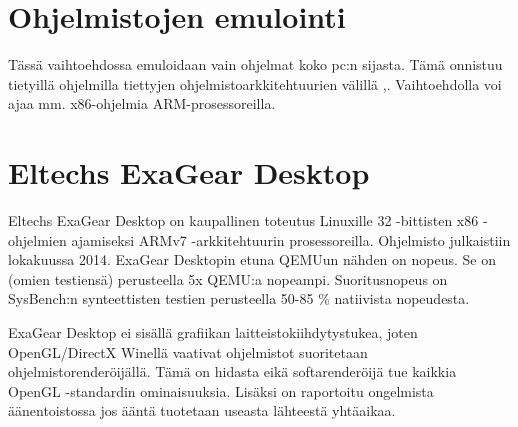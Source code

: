 \section{Ohjelmistojen emulointi}

Tässä vaihtoehdossa emuloidaan vain ohjelmat koko pc:n sijasta. Tämä onnistuu tietyillä ohjelmilla tiettyjen ohjelmistoarkkitehtuurien välillä \cite{tinycc},\cite{qemu_use}. Vaihtoehdolla voi ajaa mm. x86-ohjelmia ARM-prosessoreilla.


\section{Eltechs ExaGear Desktop}
Eltechs ExaGear Desktop on kaupallinen toteutus Linuxille 32 -bittisten x86 -ohjelmien ajamiseksi ARMv7 -arkkitehtuurin prosessoreilla. Ohjelmisto julkaistiin lokakuussa 2014. ExaGear Desktopin etuna QEMUun nähden on nopeus. Se on (omien testiensä) perusteella 5x QEMU:a nopeampi. Suoritusnopeus on SysBench:n synteettisten testien perusteella 50-85 \% natiivista nopeudesta.

ExaGear Desktop ei sisällä grafiikan laitteistokiihdytystukea, joten OpenGL/DirectX Winellä vaativat ohjelmistot suoritetaan ohjelmistorenderöijällä. Tämä on hidasta eikä softarenderöijä tue kaikkia OpenGL -standardin ominaisuuksia. Lisäksi on raportoitu ongelmista äänentoistossa jos ääntä tuotetaan useasta lähteestä yhtäaikaa.

